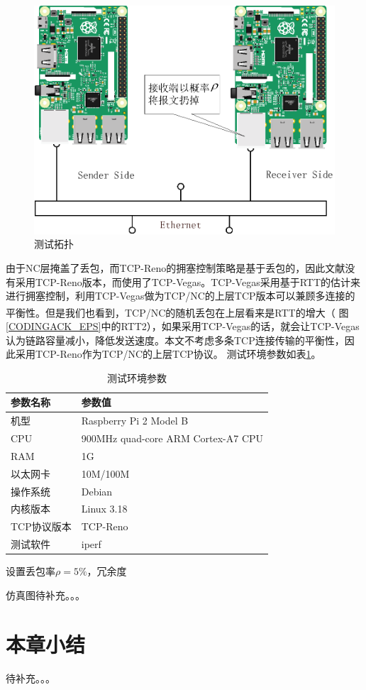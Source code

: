 \begin{figure}[htbp]
	\centering
	\includegraphics[width=5in]{figures/tuopu.eps}
	\caption{测试拓扑}
	\label{TUOPU_EPS}
\end{figure}
由于NC层掩盖了丢包，而TCP-Reno的拥塞控制策略是基于丢包的，因此文献\cite{Sundararajan2009}没有采用TCP-Reno版本，而使用了TCP-Vegas。TCP-Vegas采用基于RTT的估计来进行拥塞控制，利用TCP-Vegas做为TCP/NC的上层TCP版本可以兼顾多连接的平衡性。但是我们也看到，TCP/NC的随机丢包在上层看来是RTT的增大\textsuperscript{\cite{Sundararajan2009}}（ 图\ref{CODINGACK_EPS}中的RTT2），如果采用TCP-Vegas的话，就会让TCP-Vegas认为链路容量减小，降低发送速度。本文不考虑多条TCP连接传输的平衡性，因此采用TCP-Reno作为TCP/NC的上层TCP协议。
测试环境参数如表\ref{tab:CESHI}。
\begin{table}[htp]
	\centering
	\caption{测试环境参数}
	\label{tab:CESHI}
	\begin{tabular}{ll}
		\toprule
		参数名称&参数值\tabularnewline
		\midrule
		机型		&Raspberry Pi 2 Model B\tabularnewline
		CPU		&900MHz quad-core ARM Cortex-A7 CPU\tabularnewline
		RAM			&1G\tabularnewline
		以太网卡 	&10M/100M\tabularnewline
		操作系统 &Debian\tabularnewline
		内核版本 &Linux 3.18\tabularnewline
		TCP协议版本 &TCP-Reno\tabularnewline
		测试软件 &iperf\tabularnewline
		\bottomrule
	\end{tabular}
\end{table}
设置丢包率$\rho=5\%$，冗余度
\par
仿真图待补充。。。
\section{本章小结}
待补充。。。
